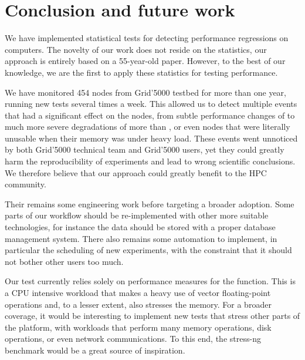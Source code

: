     \section{Conclusion and future work}%
    \label{sec:test:conclusion}

        We have implemented statistical tests for detecting performance regressions on computers. The novelty of our
        work does not reside on the statistics, our approach is entirely based on a 55-year-old paper. However, to the
        best of our knowledge, we are the first to apply these statistics for testing performance.

        We have monitored 454 nodes from Grid'5000 testbed for more than one year, running new tests several times a
        week. This allowed us to detect multiple events that had a significant effect on the nodes, from subtle
        performance changes of  to much more severe degradations of more than , or
        even nodes that were literally unusable when their memory was under heavy load. These events went unnoticed by
        both Grid'5000 technical team and Grid'5000 users, yet they could greatly harm the reproducibility of
        experiments and lead to wrong scientific conclusions. We therefore believe that our approach could greatly
        benefit to the HPC community.

        Their remains some engineering work before targeting a broader adoption. Some parts of our workflow should be
        re-implemented with other more suitable technologies, for instance the data should be stored with a proper
        database management system. There also remains some automation to implement, in particular the scheduling of
        new experiments, with the constraint that it should not bother other users too much.

        Our test currently relies solely on performance measures for the \dgemm function. This is a CPU intensive
        workload that makes a heavy use of vector floating-point operations and, to a lesser extent, also stresses the
        memory. For a broader coverage, it would be interesting to implement new tests that stress other parts of the
        platform, \eg with workloads that perform many memory operations, disk operations, or even network
        communications. To this end, the stress-ng~\cite{stress-ng} benchmark would be a great source of inspiration.

